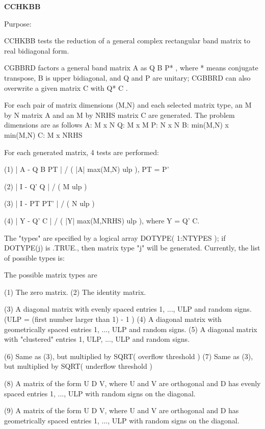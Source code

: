 {\bfseries C\+C\+H\+K\+B\+B} 

\begin{DoxyParagraph}{Purpose\+: }
\begin{DoxyVerb} CCHKBB tests the reduction of a general complex rectangular band
 matrix to real bidiagonal form.

 CGBBRD factors a general band matrix A as  Q B P* , where * means
 conjugate transpose, B is upper bidiagonal, and Q and P are unitary;
 CGBBRD can also overwrite a given matrix C with Q* C .

 For each pair of matrix dimensions (M,N) and each selected matrix
 type, an M by N matrix A and an M by NRHS matrix C are generated.
 The problem dimensions are as follows
    A:          M x N
    Q:          M x M
    P:          N x N
    B:          min(M,N) x min(M,N)
    C:          M x NRHS

 For each generated matrix, 4 tests are performed:

 (1)   | A - Q B PT | / ( |A| max(M,N) ulp ), PT = P'

 (2)   | I - Q' Q | / ( M ulp )

 (3)   | I - PT PT' | / ( N ulp )

 (4)   | Y - Q' C | / ( |Y| max(M,NRHS) ulp ), where Y = Q' C.

 The "types" are specified by a logical array DOTYPE( 1:NTYPES );
 if DOTYPE(j) is .TRUE., then matrix type "j" will be generated.
 Currently, the list of possible types is:

 The possible matrix types are

 (1)  The zero matrix.
 (2)  The identity matrix.

 (3)  A diagonal matrix with evenly spaced entries
      1, ..., ULP  and random signs.
      (ULP = (first number larger than 1) - 1 )
 (4)  A diagonal matrix with geometrically spaced entries
      1, ..., ULP  and random signs.
 (5)  A diagonal matrix with "clustered" entries 1, ULP, ..., ULP
      and random signs.

 (6)  Same as (3), but multiplied by SQRT( overflow threshold )
 (7)  Same as (3), but multiplied by SQRT( underflow threshold )

 (8)  A matrix of the form  U D V, where U and V are orthogonal and
      D has evenly spaced entries 1, ..., ULP with random signs
      on the diagonal.

 (9)  A matrix of the form  U D V, where U and V are orthogonal and
      D has geometrically spaced entries 1, ..., ULP with random
      signs on the diagonal.


\end{DoxyVerb}
\end{DoxyParagraph}
